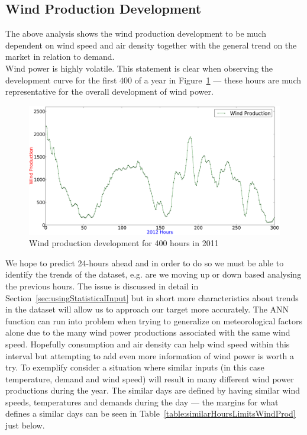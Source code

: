 \subsection{Wind Production Development}
\label{sec:windProductionDev}
The above analysis shows the wind production development to be much dependent on wind speed and air density together with the general trend on the market in relation to demand. 
\\[0.5cm]
Wind power is highly volatile. This statement is clear when observing the development curve for the first 400 of a year in Figure~\ref{fig:windHourDevelopment400Hours} --- these hours are much representative for the overall development of wind power. 

\begin{figure}[H]
\centering
\includegraphics[width=0.99\linewidth]{billeder/productionTendency400Hours.png}
\caption{Wind production development for 400 hours in 2011}
\label{fig:windHourDevelopment400Hours}
\end{figure}

\noindent We hope to predict 24-hours ahead and in order to do so we must be able to identify the trends of the dataset, e.g. are we moving up or down based analysing the previous hours. The issue is discussed in detail in Section~\ref{sec:usingStatisticalInput} but in short more characteristics about trends in the dataset will allow us to approach our target more accurately. The ANN function can run into problem when trying to generalize on meteorological factors alone due to the many wind power productions associated with the same wind speed. Hopefully consumption and air density can help wind speed within this interval but attempting to add even more information of wind power is worth a try. To exemplify consider a situation where similar inputs (in this case temperature, demand and wind speed) will result in many different wind power productions during the year. The similar days are defined by having similar wind speeds, temperatures and demands during the day --- the margins for what defines a similar days can be seen in Table~\ref{table:similarHoursLimitsWindProd} just below.

